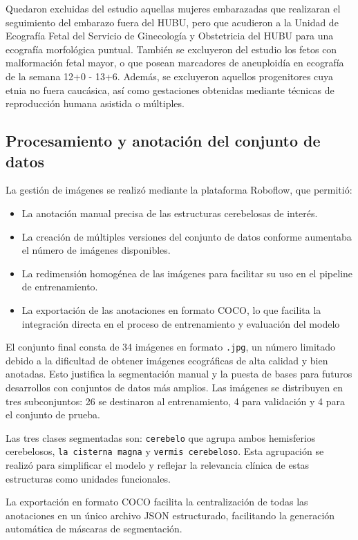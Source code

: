 Quedaron excluidas del estudio aquellas mujeres embarazadas que realizaran el seguimiento del embarazo fuera del HUBU, pero que acudieron a la Unidad de Ecografía Fetal del Servicio de Ginecología y Obstetricia del HUBU para una ecografía morfológica puntual. También se excluyeron del estudio los fetos con malformación fetal mayor, o que posean marcadores de aneuploidía en ecografía de la semana 12+0 - 13+6. Además, se excluyeron aquellos progenitores cuya etnia no fuera caucásica, así como gestaciones obtenidas mediante técnicas de reproducción humana asistida o múltiples. 

\subsection{Procesamiento y anotación del conjunto de datos}

La gestión de imágenes se realizó mediante la plataforma Roboflow, que permitió:
\begin{itemize}
    \item La anotación manual precisa de las estructuras cerebelosas de interés.
    \item La creación de múltiples versiones del conjunto de datos conforme aumentaba el número de imágenes disponibles.
    \item La redimensión homogénea de las imágenes para facilitar su uso en el pipeline de entrenamiento.
    \item La exportación de las anotaciones en formato COCO, lo que facilita la integración directa en el proceso de entrenamiento y evaluación del modelo
\end{itemize}  

El conjunto final consta de 34 imágenes en formato \texttt{.jpg}, un número limitado debido a la dificultad de obtener imágenes ecográficas de alta calidad y bien anotadas. Esto justifica la segmentación manual y la puesta de bases para futuros desarrollos con conjuntos de datos más amplios. Las imágenes se distribuyen en tres subconjuntos: 26 se destinaron al entrenamiento, 4 para validación y 4 para el conjunto de prueba.

Las tres clases segmentadas son: \texttt{cerebelo} que agrupa ambos hemisferios cerebelosos, \texttt{la cisterna magna} y \texttt{vermis cerebeloso}. Esta agrupación se realizó para simplificar el modelo y reflejar la relevancia clínica de estas estructuras como unidades funcionales.

La exportación en formato COCO facilita la centralización de todas las anotaciones en un único archivo JSON estructurado, facilitando la generación automática de máscaras de segmentación.

